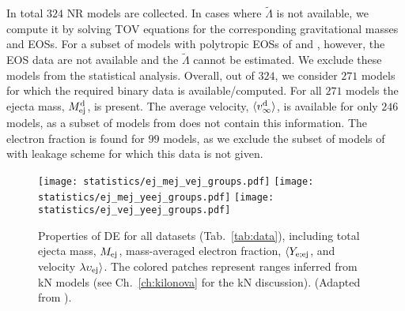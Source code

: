 In total $324$ \ac{NR} models are collected. In cases where $\tilde{\Lambda}$ 
is not available, we compute it by solving \ac{TOV} equations 
for the corresponding gravitational masses and \acp{EOS}.
% 
For a subset of models with polytropic \acp{EOS} of \citet{Bauswein:2013jpa}
and \citet{Kiuchi:2019lls}, however, the \ac{EOS} data are not available and 
the $\tilde{\Lambda}$ cannot be estimated. We exclude these models from the 
statistical analysis. Overall, out of $324$, we consider $271$ models for which 
the required binary data is available/computed. For all $271$ models the ejecta 
mass, $M^{\text{d}}_{\text{ej}}$, is present. The average velocity, $\langle v^{\text{d}}_\infty\rangle$, is available for only $246$ 
models, as a subset of models from \citet{Kiuchi:2019lls} does not contain this 
information. The electron fraction is found for $99$ models, as we exclude the 
subset of models of \citet{Lehner:2016lxy} with leakage scheme for which this 
data is not given. 

\begin{figure*}[t!]
    \centering 
    \texttt{[image: statistics/ej\_mej\_vej\_groups.pdf]}
    \texttt{[image: statistics/ej\_mej\_yeej\_groups.pdf]}
    \texttt{[image: statistics/ej\_vej\_yeej\_groups.pdf]}
    \caption{
        Properties of \ac{DE} for all datasets (Tab.~\ref{tab:data}), 
        including total ejecta mass, $M_{\rm ej}$, mass-averaged electron 
        fraction, $\langle Y_{\rm e;ej}$, and velocity 
        $\lambda\upsilon_{\rm ej}\rangle$. 
        The colored patches represent ranges inferred from \AT{} 
        \ac{kN} models \citep{Villar:2017wcc,Siegel:2019mlp}  
        (see Ch.~\ref{ch:kilonova} for the \ac{kN} discussion). 
        (Adapted from \citet{Nedora:2020qtd}). 
    }
    \label{fig:ejecta:dyn:ds}
\end{figure*}

